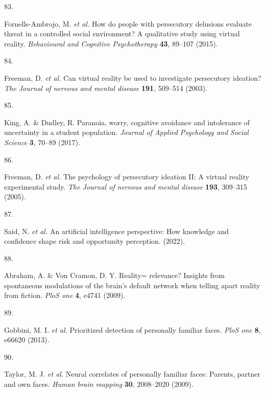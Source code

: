 \documentclass[
  man,floatsintext]{apa6}
\newlength{\cslhangindent}
\newlength{\csllabelwidth}
\newlength{\cslentryspacingunit} %
\newenvironment{CSLReferences}[2] %
 {%
  \setlength{\parindent}{0pt}
  \ifodd #1
  \let\oldpar\par
  \def\par{\hangindent=\cslhangindent\oldpar}
  \fi
  \setlength{\parskip}{#2\cslentryspacingunit}
 }%
 {}
\newcommand{\CSLLeftMargin}[1]{\parbox[t]{\csllabelwidth}{#1}}
\newcommand{\CSLRightInline}[1]{\parbox[t]{\linewidth - \csllabelwidth}{#1}\break}
\begin{document}
\begin{CSLReferences}{0}{0}
\leavevmode{}%
\CSLLeftMargin{83. }%
\CSLRightInline{Fornells-Ambrojo, M. \emph{et al.} How do people with persecutory delusions evaluate threat in a controlled social environment? A qualitative study using virtual reality. \emph{Behavioural and Cognitive Psychotherapy} \textbf{43}, 89--107 (2015).}

\leavevmode{}%
\CSLLeftMargin{84. }%
\CSLRightInline{Freeman, D. \emph{et al.} Can virtual reality be used to investigate persecutory ideation? \emph{The Journal of nervous and mental disease} \textbf{191}, 509--514 (2003).}

\leavevmode{}%
\CSLLeftMargin{85. }%
\CSLRightInline{King, A. \& Dudley, R. Paranoia, worry, cognitive avoidance and intolerance of uncertainty in a student population. \emph{Journal of Applied Psychology and Social Science} \textbf{3}, 70--89 (2017).}

\leavevmode{}%
\CSLLeftMargin{86. }%
\CSLRightInline{Freeman, D. \emph{et al.} The psychology of persecutory ideation II: A virtual reality experimental study. \emph{The Journal of nervous and mental disease} \textbf{193}, 309--315 (2005).}

\leavevmode{}%
\CSLLeftMargin{87. }%
\CSLRightInline{Said, N. \emph{et al.} An artificial intelligence perspective: How knowledge and confidence shape risk and opportunity perception. (2022).}

\leavevmode{}%
\CSLLeftMargin{88. }%
\CSLRightInline{Abraham, A. \& Von Cramon, D. Y. Reality= relevance? Insights from spontaneous modulations of the brain's default network when telling apart reality from fiction. \emph{PloS one} \textbf{4}, e4741 (2009).}

\leavevmode{}%
\CSLLeftMargin{89. }%
\CSLRightInline{Gobbini, M. I. \emph{et al.} Prioritized detection of personally familiar faces. \emph{PloS one} \textbf{8}, e66620 (2013).}

\leavevmode{}%
\CSLLeftMargin{90. }%
\CSLRightInline{Taylor, M. J. \emph{et al.} Neural correlates of personally familiar faces: Parents, partner and own faces. \emph{Human brain mapping} \textbf{30}, 2008--2020 (2009).}

\end{CSLReferences}


\clearpage
\renewcommand{\listfigurename}{Figure captions}
\end{document}
